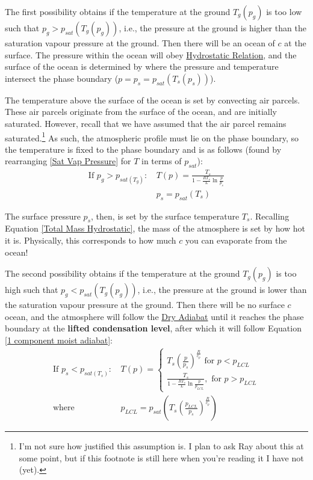 The first possibility obtains if the temperature at the ground $T_g(p_g)$ is too low such that $p_g>p_{sat}(T_g(p_g))$, i.e., the pressure at the ground is higher than the saturation vapour pressure at the ground. Then there will be an ocean of $c$ at the surface. The pressure within the ocean will obey \hyperref[Hydrostatic Balance]{Hydrostatic Relation}, and the surface of the ocean is determined by where the pressure and temperature intersect the phase boundary ($p=p_s=p_{sat}(T_s(p_s))$).

The temperature above the surface of the ocean is set by convecting air parcels. These air parcels originate from the surface of the ocean, and are initially saturated. However, recall that we have assumed that the air parcel remains saturated.\footnote{
    I'm not sure how justified this assumption is. I plan to ask Ray about this at some point, but if this footnote is still here when you're reading it I have not (yet).
} As such, the atmospheric profile must lie on the phase boundary, so the temperature is fixed to the phase boundary and is as follows (found by rearranging \ref{Sat Vap Pressure} for $T$ in terms of $p_{sat}$):
\begin{align}
    \text{If } p_g>p_{sat(T_g)}\text{: }& T(p)=\frac{T_s}{1-\frac{RT_s}{L}\ln\frac{p}{p_{s}}} \label{1 component moist adiabat} \\
    &p_s = p_{sat}(T_s)
\end{align}

The surface pressure $p_s$, then, is set by the surface temperature $T_s$. Recalling Equation \ref{Total Mass Hydrostatic}, the mass of the atmosphere is set by how hot it is. Physically, this corresponds to how much $c$ you can evaporate from the ocean!

The second possibility obtains if the temperature at the ground $T_g(p_g)$ is too high such that $p_g<p_{sat}(T_g(p_g))$, i.e., the pressure at the ground is lower than the saturation vapour pressure at the ground. Then there will be no surface $c$ ocean, and the  atmosphere will follow the \hyperref[Dry Adiabat]{Dry Adiabat} until it reaches the phase boundary at the \textbf{lifted condensation level}, after which it will follow Equation \ref{1 component moist adiabat}:
\begin{align}
    \text{If } p_s<p_{sat(T_s)}\text{: }
    &
    T(p)=
    \begin{cases}
        T_s\left(\frac{p}{p_s}\right)^\frac{R}{c_p} \text{ for }p<p_{LCL}\\
        \frac{T_s}{1-\frac{RT_s}{L}\ln\frac{p}{p_{LCL}}}, \text{ for }p>p_{LCL}
    \end{cases}\\
    \text{where }&p_{LCL}=p_{sat}\left( T_s\left(\frac{p_{LCL}}{p_s}\right)^\frac{R}{c_p} \right)
\end{align}

